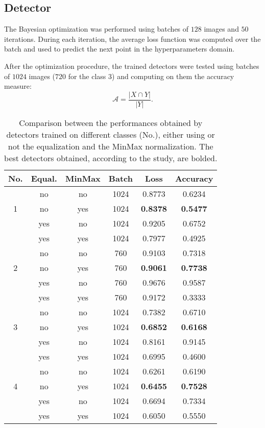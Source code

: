 \subsection{Detector}\label{section:results:detector}
\par{
	The Bayesian optimization was performed using batches of $128$ images and $50$ iterations. During each iteration, the average loss function was computed over the batch and used to predict the next point in the hyperparameters domain. 
}
\par{
	After the optimization procedure, the trained detectors were tested using batches of $1024$ images ($720$ for the class $3$) and computing on them the accuracy measure:
	\begin{equation*}
	\mathcal{A} = \frac{\lvert X \cap Y \rvert}{\lvert Y \rvert}.
	\end{equation*}
}
\begin{table}
	\centering
	\normalsize	
	\begin{tabular}{|c|c|c|c|c|c|}
		\hline		
		\textbf{No.} & \textbf{Equal.} & \textbf{MinMax} & \textbf{Batch} & \textbf{Loss} & \textbf{Accuracy}\\ \hline
		\multirow{3}{*}{1} & no & no & 1024 & 0.8773 & 0.6234 \\
		& no & yes & 1024 & \textbf{0.8378} & \textbf{0.5477} \\
		& yes & no & 1024 & 0.9205 & 0.6752 \\
		& yes & yes & 1024 & 0.7977 & 0.4925 \\ \hline
		\multirow{3}{*}{2} & no & no & 760 & 0.9103 & 0.7318\\
		& no & yes & 760 & \textbf{0.9061} & \textbf{0.7738} \\
		& yes & no & 760 & 0.9676 & 0.9587 \\
		& yes & yes & 760 & 0.9172 & 0.3333 \\ \hline
		\multirow{3}{*}{3} & no & no & 1024 & 0.7382 & 0.6710 \\
		& no & yes & 1024 & \textbf{0.6852} & \textbf{0.6168} \\
		& yes & no & 1024 & 0.8161 & 0.9145 \\
		& yes & yes & 1024 & 0.6995 & 0.4600 \\ \hline
		\multirow{3}{*}{4} & no & no & 1024 & 0.6261 & 0.6190 \\
		& no & yes & 1024 & \textbf{0.6455} & \textbf{0.7528} \\
		& yes & no & 1024 & 0.6694 & 0.7334 \\
		& yes & yes & 1024 & 0.6050 & 0.5550 \\ \hline
	\end{tabular}
	\vspace{0.25cm}
	\caption{Comparison between the performances obtained by detectors trained on different classes (No.), either using or not the equalization and the MinMax normalization. The best detectors obtained, according to the study, are bolded.}\label{table:test-bayesopt}
\end{table}

